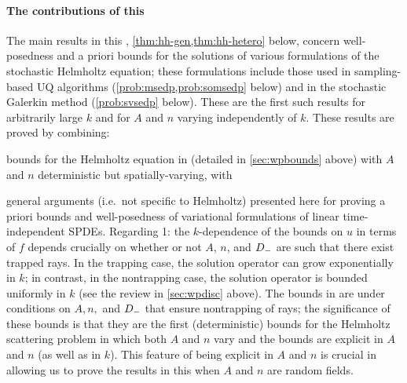 \paragraph{The contributions of this } The main results in this , \cref{thm:hh-gen,thm:hh-hetero} below, concern well-posedness and a priori bounds for the solutions of various formulations of the stochastic Helmholtz equation; these formulations include those used in sampling-based UQ algorithms (\cref{prob:msedp,prob:somsedp} below) and in the stochastic Galerkin method (\cref{prob:svsedp} below). These are the first such results for arbitrarily large $k$ and for $A$ and $n$ varying independently of $k$. These results are proved by combining:
\ben
\item bounds for the Helmholtz equation in \cite{GrPeSp:19} (detailed in \cref{sec:wpbounds} above) with $A$ and $n$ deterministic but spatially-varying, with
\item general arguments (i.e.~not specific to Helmholtz) presented here for proving a priori bounds and well-posedness of variational formulations of linear time-independent SPDEs.
\een
Regarding 1: the $k$-dependence of the bounds on $u$ in terms of $f$ depends crucially on whether or not $A$, $n$, and $D_{-}$ are such that there exist trapped rays. In the trapping case, the solution operator can grow exponentially in $k$; in contrast, in the nontrapping case, the solution operator is bounded uniformly in $k$ (see the review in \cref{sec:wpdisc} above). The bounds in \cite{GrPeSp:19} are under conditions on $A,n,$ and $D_{-}$ that ensure nontrapping of rays; the significance of these bounds is that they are the first (deterministic) bounds for the Helmholtz scattering problem in which both $A$ and $n$ vary and the bounds are explicit in $A$ and $n$ (as well as in $k$). This feature of being explicit in $A$ and $n$ is crucial in allowing us to prove the results in this  when $A$ and $n$ are random fields.

